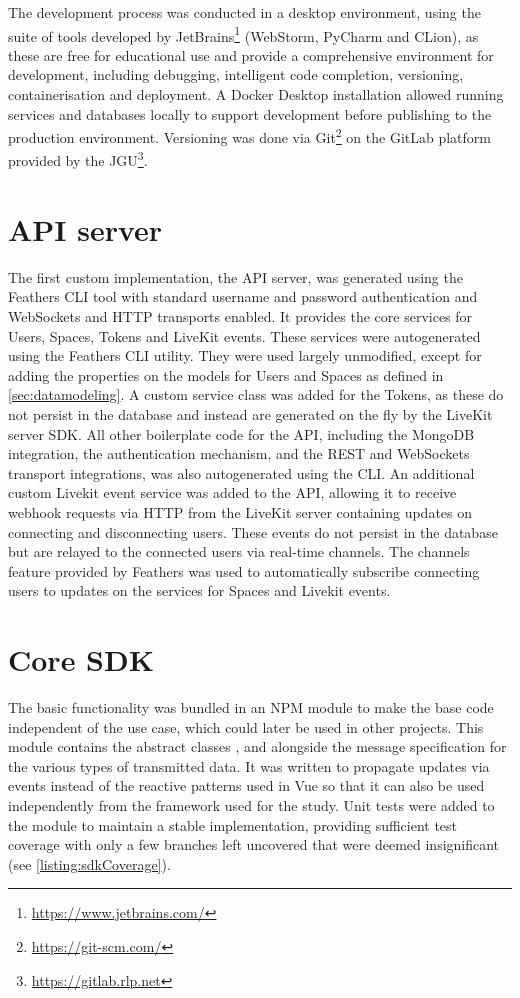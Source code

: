 The development process was conducted in a desktop environment, using the suite of tools developed by JetBrains\footnote{\url{https://www.jetbrains.com/}} (WebStorm, PyCharm and CLion), as these are free for educational use and provide a comprehensive environment for development, including debugging, intelligent code completion, versioning, containerisation and deployment.
A Docker Desktop installation allowed running services and databases locally to support development before publishing to the production environment.
Versioning was done via Git\footnote{\url{https://git-scm.com/}} on the GitLab platform provided by the \ac{JGU}\footnote{\url{https://gitlab.rlp.net}}.

\section{API server}
\label{sec:api-server}

The first custom implementation, the \ac{API} server, was generated using the Feathers \ac{CLI} tool with standard username and password authentication and WebSockets and \ac{HTTP} transports enabled.
It provides the core services for Users, Spaces, Tokens and LiveKit events.
These services were autogenerated using the Feathers \ac{CLI} utility.
They were used largely unmodified, except for adding the properties on the models for Users and Spaces as defined in \autoref{sec:datamodeling}.
A custom service class was added for the Tokens, as these do not persist in the database and instead are generated on the fly by the LiveKit server \ac{SDK}.
All other boilerplate code for the \ac{API}, including the MongoDB integration, the authentication mechanism, and the REST and WebSockets transport integrations, was also autogenerated using the \ac{CLI}.
An additional custom Livekit event service was added to the API, allowing it to receive webhook requests via \ac{HTTP} from the LiveKit server containing updates on connecting and disconnecting users.
These events do not persist in the database but are relayed to the connected users via real-time channels.
The channels feature provided by Feathers was used to automatically subscribe connecting users to updates on the services for Spaces and Livekit events.

\section{Core SDK}
\label{sec:core-sdk}

The basic functionality was bundled in an \ac{NPM} module to make the base code independent of the use case, which could later be used in other projects.
This module contains the abstract classes ,  and  alongside the message specification for the various types of transmitted data.
It was written to propagate updates via events instead of the reactive patterns used in Vue so that it can also be used independently from the framework used for the study.
Unit tests were added to the module to maintain a stable implementation, providing sufficient test coverage with only a few branches left uncovered that were deemed insignificant (see \autoref{listing:sdkCoverage}).

